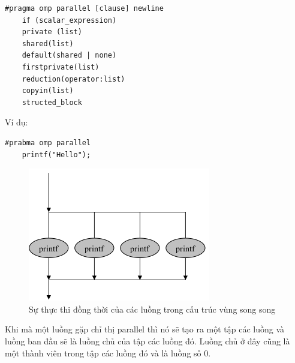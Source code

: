 \documentclass{report}
\begin{document}
\begin{verbatim}
#pragma omp parallel [clause] newline
	if (scalar_expression)
	private (list)
	shared(list)
	default(shared | none)
	firstprivate(list)
	reduction(operator:list)
	copyin(list)
	structed_block
\end{verbatim}

Ví dụ:
\begin{verbatim}
#prabma omp parallel
	printf("Hello");
	\end{verbatim}
	
	
\begin{figure}[htp]
\centering
\includegraphics[scale=0.6]{img/pic3.png}
\caption{Sự thực thi đồng thời của các luồng trong cấu trúc vùng song song}
\end{figure}

Khi mà một luồng gặp chỉ thị \textsf{parallel} thì nó sẽ tạo ra một tập các luồng
và luồng ban đầu sẽ là luồng chủ của tập các luồng đó. Luồng chủ ở đây cũng là một
thành viên trong tập các luồng đó và là luồng số 0.
\end{document}
